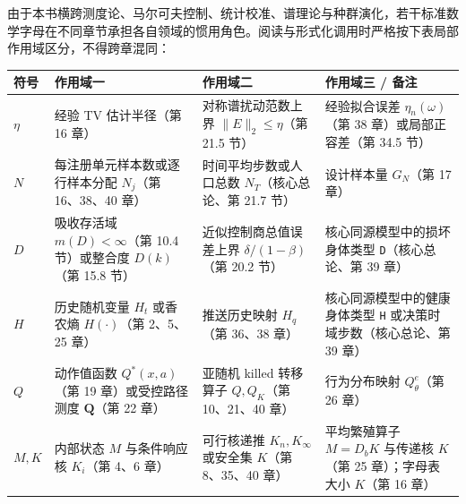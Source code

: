 \documentclass[
  11pt,
  oneside]{book}
\newcounter{none} %
\begin{document}
由于本书横跨测度论、马尔可夫控制、统计校准、谱理论与种群演化，若干标准数学字母在不同章节承担各自领域的惯用角色。阅读与形式化调用时严格按下表局部作用域区分，不得跨章混同：

{\def\LTcaptype{none} %
\begin{longtable}[]{@{}
  >{\raggedright\arraybackslash}p{}
  >{\raggedright\arraybackslash}p{}
  >{\raggedright\arraybackslash}p{}
  >{\raggedright\arraybackslash}p{}@{}}
\toprule\noalign{}
\begin{minipage}[b]{\linewidth}\raggedright
符号
\end{minipage} & \begin{minipage}[b]{\linewidth}\raggedright
作用域一
\end{minipage} & \begin{minipage}[b]{\linewidth}\raggedright
作用域二
\end{minipage} & \begin{minipage}[b]{\linewidth}\raggedright
作用域三 / 备注
\end{minipage} \\
\midrule\noalign{}
\endhead
\bottomrule\noalign{}
\endlastfoot
\(\eta\) & 经验 TV 估计半径（第 16 章） & 对称谱扰动范数上界 \(\|E\|_2\le\eta\)（第 21.5 节） & 经验拟合误差 \(\eta_n(\omega)\)（第 38 章）或局部正容差（第 34.5 节） \\
\(N\) & 每注册单元样本数或逐行样本分配 \(N_j\)（第 16、38、40 章） & 时间平均步数或人口总数 \(N_T\)（核心总论、第 21.7 节） & 设计样本量 \(G_N\)（第 17 章） \\
\(D\) & 吸收存活域 \(m(D)<\infty\)（第 10.4 节）或整合度 \(D(k)\)（第 15.8 节） & 近似控制商总值误差上界 \(\delta/(1-\beta)\)（第 20.2 节） & 核心同源模型中的损坏身体类型 \texttt{D}（核心总论、第 39 章） \\
\(H\) & 历史随机变量 \(H_t\) 或香农熵 \(H(\cdot)\)（第 2、5、25 章） & 推送历史映射 \(H_q\)（第 36、38 章） & 核心同源模型中的健康身体类型 \texttt{H} 或决策时域步数（核心总论、第 39 章） \\
\(Q\) & 动作值函数 \(Q^*(x,a)\)（第 19 章）或受控路径测度 \(\mathbf Q\)（第 22 章） & 亚随机 killed 转移算子 \(Q,Q_K\)（第 10、21、40 章） & 行为分布映射 \(Q_\theta^e\)（第 26 章） \\
\(M,K\) & 内部状态 \(M\) 与条件响应核 \(K_i\)（第 4、6 章） & 可行核递推 \(K_n,K_\infty\) 或安全集 \(K\)（第 8、35、40 章） & 平均繁殖算子 \(M=D_bK\) 与传递核 \(K\)（第 25 章）；字母表大小 \(K\)（第 16 章） \\

\end{longtable}}
\end{document}
